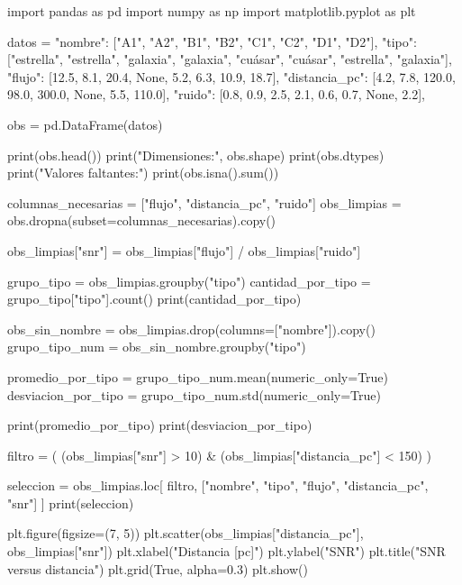 \begin{solution}
\begin{pythonjupyter}
import pandas as pd
import numpy as np
import matplotlib.pyplot as plt

datos = {
    "nombre": ["A1", "A2", "B1", "B2", "C1", "C2", "D1", "D2"],
    "tipo": ["estrella", "estrella", "galaxia", "galaxia",
             "cuásar", "cuásar", "estrella", "galaxia"],
    "flujo": [12.5, 8.1, 20.4, None, 5.2, 6.3, 10.9, 18.7],
    "distancia_pc": [4.2, 7.8, 120.0, 98.0, 300.0, None, 5.5, 110.0],
    "ruido": [0.8, 0.9, 2.5, 2.1, 0.6, 0.7, None, 2.2],
}

obs = pd.DataFrame(datos)

print(obs.head())
print("Dimensiones:", obs.shape)
print(obs.dtypes)
print("Valores faltantes:")
print(obs.isna().sum())

columnas_necesarias = ["flujo", "distancia_pc", "ruido"]
obs_limpias = obs.dropna(subset=columnas_necesarias).copy()

obs_limpias["snr"] = obs_limpias["flujo"] / obs_limpias["ruido"]

grupo_tipo = obs_limpias.groupby("tipo")
cantidad_por_tipo = grupo_tipo["tipo"].count()
print(cantidad_por_tipo)

obs_sin_nombre = obs_limpias.drop(columns=["nombre"]).copy()
grupo_tipo_num = obs_sin_nombre.groupby("tipo")

promedio_por_tipo = grupo_tipo_num.mean(numeric_only=True)
desviacion_por_tipo = grupo_tipo_num.std(numeric_only=True)

print(promedio_por_tipo)
print(desviacion_por_tipo)

filtro = (
    (obs_limpias["snr"] > 10) &
    (obs_limpias["distancia_pc"] < 150)
)

seleccion = obs_limpias.loc[
    filtro,
    ["nombre", "tipo", "flujo", "distancia_pc", "snr"]
]
print(seleccion)

plt.figure(figsize=(7, 5))
plt.scatter(obs_limpias["distancia_pc"], obs_limpias["snr"])
plt.xlabel("Distancia [pc]")
plt.ylabel("SNR")
plt.title("SNR versus distancia")
plt.grid(True, alpha=0.3)
plt.show()
\end{pythonjupyter}
\end{solution}
